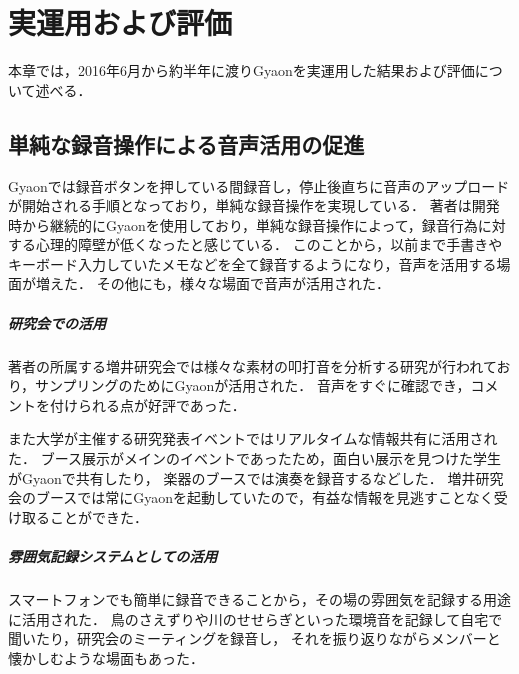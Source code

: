 \chapter{実運用および評価}
\label{chap:evaluation}

本章では，2016年6月から約半年に渡りGyaonを実運用した結果および評価について述べる．

\newpage

\section{単純な録音操作による音声活用の促進}
Gyaonでは録音ボタンを押している間録音し，停止後直ちに音声のアップロードが開始される手順となっており，単純な録音操作を実現している．
著者は開発時から継続的にGyaonを使用しており，単純な録音操作によって，録音行為に対する心理的障壁が低くなったと感じている．
このことから，以前まで手書きやキーボード入力していたメモなどを全て録音するようになり，音声を活用する場面が増えた．
その他にも，様々な場面で音声が活用された．

\paragraph*{研究会での活用}
著者の所属する増井研究会では様々な素材の叩打音を分析する研究が行われており，サンプリングのためにGyaonが活用された．
音声をすぐに確認でき，コメントを付けられる点が好評であった．

また大学が主催する研究発表イベントではリアルタイムな情報共有に活用された．
ブース展示がメインのイベントであったため，面白い展示を見つけた学生がGyaonで共有したり，
楽器のブースでは演奏を録音するなどした．
増井研究会のブースでは常にGyaonを起動していたので，有益な情報を見逃すことなく受け取ることができた．

%


\paragraph*{雰囲気記録システムとしての活用}
スマートフォンでも簡単に録音できることから，その場の雰囲気を記録する用途に活用された．
鳥のさえずりや川のせせらぎといった環境音を記録して自宅で聞いたり，研究会のミーティングを録音し，
それを振り返りながらメンバーと懐かしむような場面もあった．

